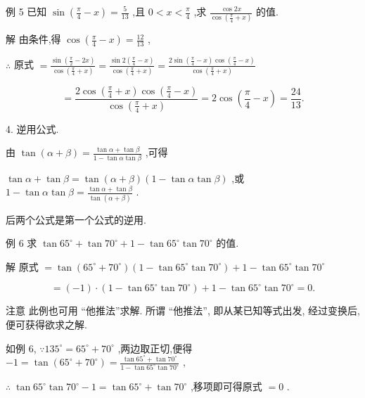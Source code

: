 \documentclass[10pt]{article}
\begin{document}
例 5 已知 \(\sin \left( {\frac{\pi }{4} - x}\right)  = \frac{5}{13}\) ,且 \(0 < x < \frac{\pi }{4}\) ,求 \(\frac{\cos {2x}}{\cos \left( {\frac{\pi }{4} + x}\right) }\) 的值.

解 由条件,得 \(\cos \left( {\frac{\pi }{4} - x}\right)  = \frac{12}{13}\) ,

\(\therefore\) 原式 \(= \frac{\sin \left( {\frac{\pi }{2} - {2x}}\right) }{\cos \left( {\frac{\pi }{4} + x}\right) } = \frac{\sin 2\left( {\frac{\pi }{4} - x}\right) }{\cos \left( {\frac{\pi }{4} + x}\right) } = \frac{2\sin \left( {\frac{\pi }{4} - x}\right) \cos \left( {\frac{\pi }{4} - x}\right) }{\cos \left( {\frac{\pi }{4} + x}\right) }\)

\[
= \frac{2\cos \left( {\frac{\pi }{4} + x}\right) \cos \left( {\frac{\pi }{4} - x}\right) }{\cos \left( {\frac{\pi }{4} + x}\right) } = 2\cos \left( {\frac{\pi }{4} - x}\right)  = \frac{24}{13}.
\]

4. 逆用公式.

由 \(\tan \left( {\alpha  + \beta }\right)  = \frac{\tan \alpha  + \tan \beta }{1 - \tan \alpha \tan \beta }\) ,可得

\(\tan \alpha  + \tan \beta  = \tan \left( {\alpha  + \beta }\right) \left( {1 - \tan \alpha \tan \beta }\right)\) ,或 \(1 - \tan \alpha \tan \beta  = \frac{\tan \alpha  + \tan \beta }{\tan \left( {\alpha  + \beta }\right) }\) .

后两个公式是第一个公式的逆用.

例 6 求 \(\tan {65}^{ \circ  } + \tan {70}^{ \circ  } + 1 - \tan {65}^{ \circ  }\tan {70}^{ \circ  }\) 的值.

解 原式 \(= \tan \left( {{65}^{ \circ  } + {70}^{ \circ  }}\right) \left( {1 - \tan {65}^{ \circ  }\tan {70}^{ \circ  }}\right)  + 1 - \tan {65}^{ \circ  }\tan {70}^{ \circ  }\)

\[
= \left( {-1}\right)  \cdot  \left( {1 - \tan {65}^{ \circ  }\tan {70}^{ \circ  }}\right)  + 1 - \tan {65}^{ \circ  }\tan {70}^{ \circ  } = 0.
\]

注意 此例也可用 “他推法”求解. 所谓 “他推法”, 即从某已知等式出发, 经过变换后, 便可获得欲求之解.

如例 6, \(\because {135}^{ \circ  } = {65}^{ \circ  } + {70}^{ \circ  }\) ,两边取正切,便得 \(- 1 = \tan \left( {{65}^{ \circ  } + {70}^{ \circ  }}\right)  = \frac{\tan {65}^{ \circ  } + \tan {70}^{ \circ  }}{1 - \tan {65}^{ \circ  }\tan {70}^{ \circ  }}\) ,

\(\therefore \;\tan {65}^{ \circ  }\tan {70}^{ \circ  } - 1 = \tan {65}^{ \circ  } + \tan {70}^{ \circ  }\) ,移项即可得原式 \(= 0\) .
\end{document}
